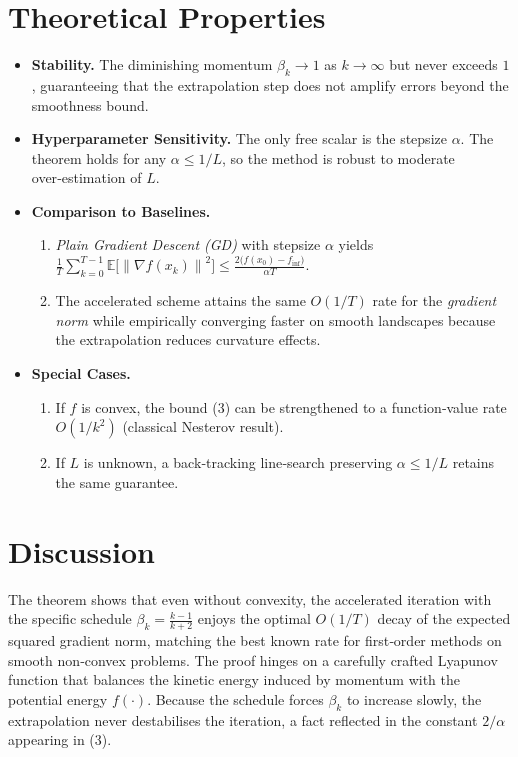 \documentclass[11pt]{article}
\newcommand{\E}{\mathbb{E}}
\newcommand{\norm}[1]{\left\|#1\right\|}
\newcommand{\grad}{\nabla}
\begin{document}
\section*{Theoretical Properties}
\begin{itemize}[leftmargin=*]
\item \textbf{Stability.} The diminishing momentum $\beta_k\to 1$ as $k\to\infty$ but never exceeds $1$, guaranteeing that the extrapolation step does not amplify errors beyond the smoothness bound.
\item \textbf{Hyperparameter Sensitivity.} The only free scalar is the stepsize $\alpha$. The theorem holds for any $\alpha\le 1/L$, so the method is robust to moderate over‑estimation of $L$.
\item \textbf{Comparison to Baselines.}
    \begin{enumerate}
        \item \emph{Plain Gradient Descent (GD)} with stepsize $\alpha$ yields
            $\frac{1}{T}\sum_{k=0}^{T-1}\E\!\bigl[\norm{\grad f(x_k)}^{2}\bigr]\le
            \frac{2\bigl(f(x_0)-f_{\inf}\bigr)}{\alpha T}$.
        \item The accelerated scheme attains the same $O(1/T)$ rate for the \emph{gradient norm} while empirically converging faster on smooth landscapes because the extrapolation reduces curvature effects.
    \end{enumerate}
\item \textbf{Special Cases.}
    \begin{enumerate}
        \item If $f$ is convex, the bound (3) can be strengthened to a function‑value rate $O(1/k^{2})$ (classical Nesterov result).
        \item If $L$ is unknown, a back‑tracking line‑search preserving $\alpha\le 1/L$ retains the same guarantee.
    \end{enumerate}
\end{itemize}

\section*{Discussion}
The theorem shows that even without convexity, the accelerated iteration with the specific schedule $\beta_k=\frac{k-1}{k+2}$ enjoys the optimal $O(1/T)$ decay of the expected squared gradient norm, matching the best known rate for first‑order methods on smooth non‑convex problems. The proof hinges on a carefully crafted Lyapunov function that balances the kinetic energy induced by momentum with the potential energy $f(\cdot)$. Because the schedule forces $\beta_k$ to increase slowly, the extrapolation never destabilises the iteration, a fact reflected in the constant $2/\alpha$ appearing in (3).
\end{document}
